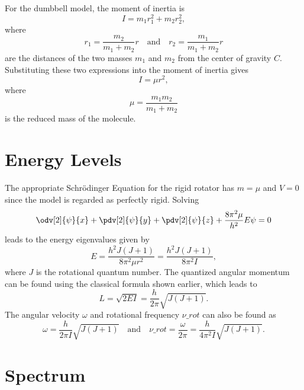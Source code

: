 \documentclass[11pt, twoside, fleqn]{report}
\begin{document}
For the dumbbell model, the moment of inertia is
\begin{equation*}
    I = m_1r_1^2 + m_2r_2^2,
\end{equation*}
where
\begin{equation*}
    r_1 = \frac{m_2}{m_1 + m_2}r \quad\text{and}\quad r_2 = \frac{m_1}{m_1 + m_2}r
\end{equation*}
are the distances of the two masses $m_1$ and $m_2$ from the center of gravity $C$. Substituting these two expressions into the moment of inertia gives
\begin{equation*}
    I = \mu r^2,
\end{equation*}
where
\begin{equation*}
    \mu = \frac{m_1m_2}{m_1 + m_2}
\end{equation*}
is the reduced mass of the molecule.

\section{Energy Levels}
\label{s:energy_levels_1}

The appropriate Schr\"odinger Equation for the rigid rotator has $m = \mu$ and $V = 0$ since the model is regarded as perfectly rigid. Solving
\begin{equation*}
    \odv[2]{\psi}{x} + \pdv[2]{\psi}{y} + \pdv[2]{\psi}{z} + \frac{8\pi^2\mu}{h^2}E\psi = 0
\end{equation*}
leads to the energy eigenvalues given by
\begin{equation*}
    E = \frac{h^2J(J + 1)}{8\pi^2\mu r^2} = \frac{h^2J(J + 1)}{8\pi^2I},
\end{equation*}
where $J$ is the rotational quantum number. The quantized angular momentum can be found using the classical formula shown earlier, which leads to
\begin{equation*}
    L = \sqrt{2EI} = \frac{h}{2\pi}\sqrt{J(J + 1)}.
\end{equation*}
The angular velocity $\omega$ and rotational frequency $\nu\_{rot}$ can also be found as
\begin{equation*}
    \omega = \frac{h}{2\pi I}\sqrt{J(J + 1)} \quad\text{and}\quad \nu\_{rot} = \frac{\omega}{2\pi} = \frac{h}{4\pi^2I}\sqrt{J(J + 1)}.
\end{equation*}

\section{Spectrum}
\label{s:spectrum_1}
\end{document}
